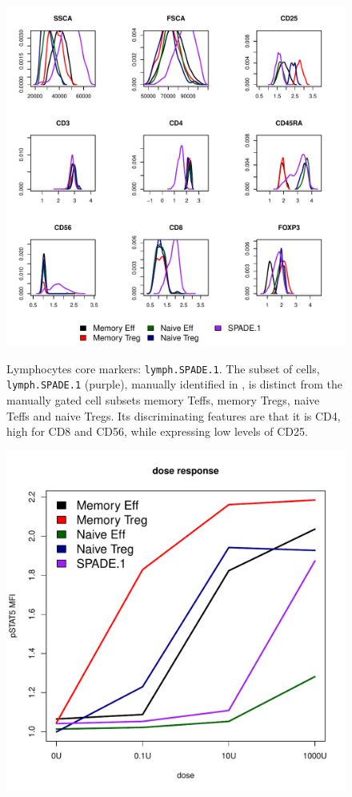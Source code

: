 %
\begin{figure}
\centering
\begin{minipage}{.65\textwidth}
\includegraphics[width=\linewidth]{figures/spade-lymphocytes-clusters}
\end{minipage}
{ Lymphocytes core markers: \texttt{lymph.SPADE.1}.  }
{ The subset of cells, \texttt{lymph.SPADE.1} (purple), manually identified in , is distinct from the manually gated cell subsets memory Teffs, memory Tregs, naive Teffs and naive Tregs. Its discriminating features are that it is CD4\negative, high for CD8 and CD56, while expressing low levels of CD25.
} 
%
\begin{minipage}{.5\textwidth}
  \includegraphics[scale=0.4]{figures/spade-lymphocytes-dose-response}

\end{minipage}
\end{figure}
